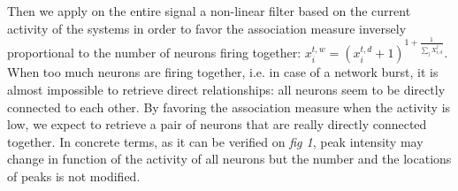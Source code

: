 \documentclass[wcp]{jmlr}
\begin{document}

Then we apply on the entire signal a non-linear filter based on the
current activity of the systems in order to favor the association measure inversely
proportional to the number of neurons firing together:
$ x^{t,w}_i  = (x^{t,d}_i + 1 )^{1 + \frac{1}{\sum_{j} X_{t,d}^j}} $.
When too much neurons are firing together, i.e. in case of a network burst, it is almost
impossible to retrieve direct relationships: all neurons seem to be directly
connected to each other. By favoring the association measure when the activity is low,
we expect to retrieve a pair of neurons that are really directly connected together.
In concrete terms, as it can be verified on \textit{fig 1}, peak intensity may change in function
of the activity of all neurons but the number and the locations of peaks is not modified.





\end{document}
